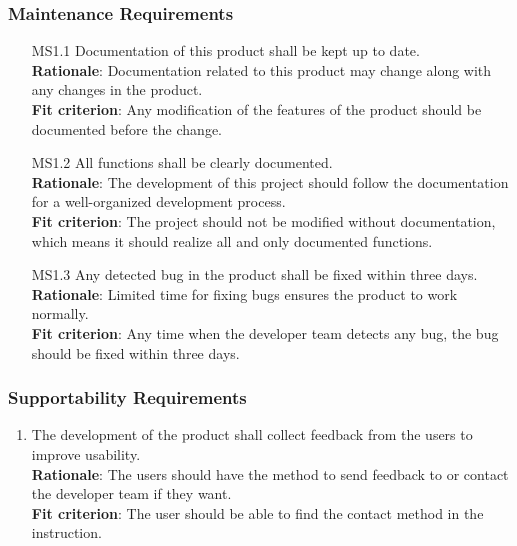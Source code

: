 \documentclass{article}
\begin{document}
\subsubsection{Maintenance Requirements}
\begin{enumerate}
    \item[MS1.1] Documentation of this product shall be kept up to date.\\
    \textbf{Rationale}: Documentation related to this product may change along with any changes in the product. \\
    \textbf{Fit criterion}: Any modification of the features of the product should be documented before the change.\\
    \item[MS1.2] All functions shall be clearly documented.\\
    \textbf{Rationale}: The development of this project should follow the documentation for a well-organized development process.\\
    \textbf{Fit criterion}: The project should not be modified without documentation, which means it should realize all and only documented functions.\\
    \item[MS1.3] Any detected bug in the product shall be fixed within three days.\\
    \textbf{Rationale}: Limited time for fixing bugs ensures the product to work normally.\\
    \textbf{Fit criterion}: Any time when the developer team detects any bug, the bug should be fixed within three days.\\
\end{enumerate}
\subsubsection{Supportability Requirements}
\begin{enumerate}[MS2.1]
    \item The development of the product shall collect feedback from the users to improve usability.\\
    \textbf{Rationale}: The users should have the method to send feedback to or contact the developer team if they want. \\
    \textbf{Fit criterion}: The user should be able to find the contact method in the instruction.\\
\end{enumerate}
\end{document}
